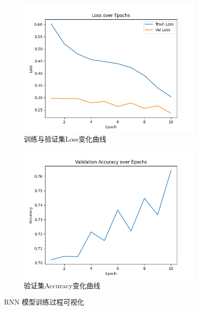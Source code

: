 \documentclass[11pt]{article}
\begin{document}
\begin{figure}[htbp]
    \centering
    \begin{subfigure}{0.45\textwidth}
        \centering
        \includegraphics[width=\textwidth]{../../result/train_loss_rnn.png}
        \caption{训练与验证集Loss变化曲线}
    \end{subfigure}
    \hfill
    \begin{subfigure}{0.45\textwidth}
        \centering
        \includegraphics[width=\textwidth]{../../result/val_accuracy_rnn.png}
        \caption{验证集Accuracy变化曲线}
    \end{subfigure}
    \caption{RNN 模型训练过程可视化}
\end{figure}
\end{document}
